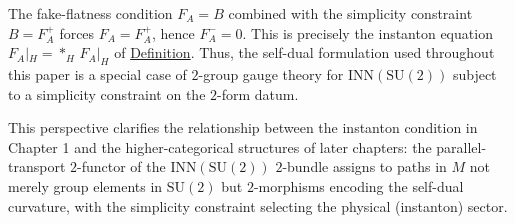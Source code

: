 \begin{remark}
The fake-flatness condition $F_A = B$ combined with the simplicity
constraint $B = F_A^+$ forces $F_A = F_A^+$, hence $F_A^- = 0$.
This is precisely the instanton equation
$F_A|_H = {*_H}\,F_A|_H$
of \hyperref[def:instanton]{Definition}. Thus, the self-dual formulation
used throughout this paper is a special case of $2$-group gauge theory
for $\mathrm{INN}(\mathrm{SU}(2))$ subject to a simplicity constraint
on the $2$-form datum.

This perspective clarifies the relationship between the instanton
condition in Chapter 1 and the higher-categorical structures of later
chapters: the parallel-transport $2$-functor of the
$\mathrm{INN}(\mathrm{SU}(2))$ $2$-bundle assigns to paths in $M$
not merely group elements in $\mathrm{SU}(2)$ but $2$-morphisms
encoding the self-dual curvature, with the simplicity constraint
selecting the physical (instanton) sector.
\end{remark}

